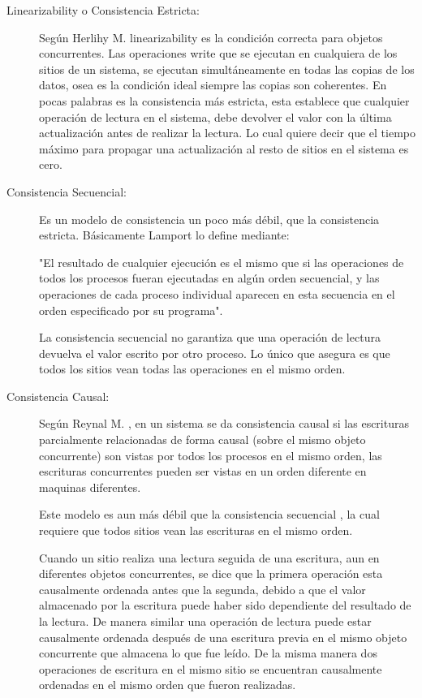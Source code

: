 \begin{description}

\item[Linearizability o Consistencia Estricta: ]
Según Herlihy M. \cite{herlihy} linearizability es la condición correcta para objetos concurrentes. Las operaciones write que se ejecutan en cualquiera de los sitios de un sistema, se ejecutan simultáneamente en todas las copias de los datos, osea es la condición ideal siempre las copias son coherentes. 
En pocas palabras es la consistencia más estricta, esta establece que cualquier operación de lectura en el sistema, debe devolver el valor con la última actualización antes de realizar la lectura. Lo cual quiere decir que el tiempo máximo para propagar una actualización al resto de sitios en el sistema es cero. 

\item[Consistencia Secuencial: ]
Es un modelo de consistencia un poco más débil, que la consistencia estricta. Básicamente Lamport \cite{lamport:1979} lo define mediante:

"El resultado de cualquier ejecución es el mismo que si las operaciones de todos los procesos fueran ejecutadas en algún orden secuencial, y las operaciones de cada proceso individual aparecen en esta secuencia en el orden especificado por su programa". 

La consistencia secuencial no garantiza que una operación de lectura devuelva el valor escrito por otro proceso. Lo único que asegura es que todos los sitios vean todas las operaciones en el mismo orden.

\item[Consistencia Causal: ]
Según Reynal M. \cite{raynal:1995}, en un sistema se da consistencia causal si las escrituras parcialmente relacionadas de forma causal (sobre el mismo objeto concurrente) son vistas por todos los procesos en el mismo orden, las escrituras concurrentes pueden ser vistas en un orden diferente en maquinas diferentes.

Este modelo es aun más débil que la consistencia secuencial \cite{ahamad:1991}, la cual requiere que todos sitios vean las escrituras en el mismo orden.

Cuando un sitio realiza una lectura seguida de una escritura, aun en diferentes objetos concurrentes, se dice que la primera operación esta causalmente ordenada antes que la segunda, debido a que el valor almacenado por la escritura puede haber sido dependiente del resultado de la lectura. De manera similar una operación de lectura puede estar causalmente ordenada después de una escritura previa en el mismo objeto concurrente que almacena lo que fue leído. De la misma manera dos operaciones de escritura en el mismo sitio se encuentran causalmente ordenadas en el mismo orden que fueron realizadas. 


\end{description}
